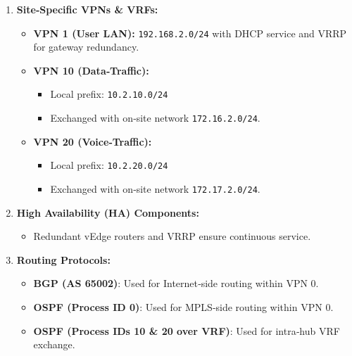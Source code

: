 \documentclass[12pt,english]{report}
\begin{document}
\begin{enumerate}
    \item \textbf{Site‑Specific VPNs \& VRFs:}
    \begin{itemize}
        \item \textbf{VPN 1 (User LAN):} \texttt{192.168.2.0/24} with DHCP service and VRRP for gateway redundancy.
        \item \textbf{VPN 10 (Data‑Traffic):}
        \begin{itemize}
            \item Local prefix: \texttt{10.2.10.0/24}
            \item Exchanged with on‑site network \texttt{172.16.2.0/24}.
        \end{itemize}
        \item \textbf{VPN 20 (Voice‑Traffic):}
        \begin{itemize}
            \item Local prefix: \texttt{10.2.20.0/24}
            \item Exchanged with on‑site network \texttt{172.17.2.0/24}.
        \end{itemize}
    \end{itemize}

    \item \textbf{High Availability (HA) Components:}
    \begin{itemize}
        \item Redundant vEdge routers and VRRP ensure continuous service.
    \end{itemize}

    \item \textbf{Routing Protocols:}
    \begin{itemize}
        \item \textbf{BGP (AS 65002)}: Used for Internet‑side routing within VPN 0.
        \item \textbf{OSPF (Process ID 0)}: Used for MPLS‑side routing within VPN 0.
        \item \textbf{OSPF (Process IDs 10 \& 20 over VRF)}: Used for intra‑hub VRF exchange.
    \end{itemize}
\end{enumerate}
\end{document}
